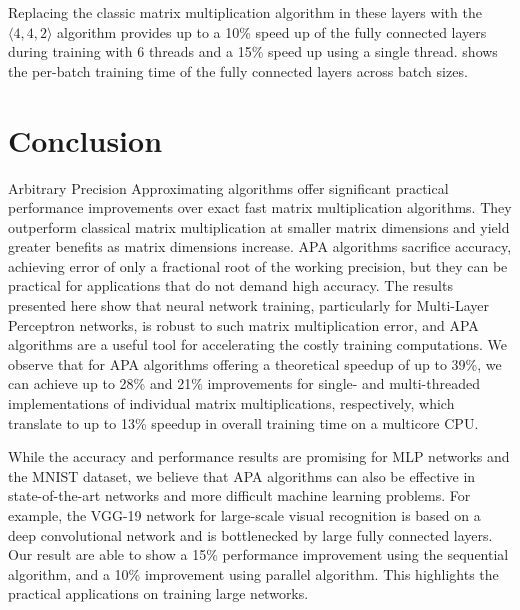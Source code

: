\documentclass[sigconf,review,anonymous]{acmart}
\newcommand{\dims}[1]{\langle #1 \rangle}
\begin{document}

Replacing the classic matrix multiplication algorithm in these layers with the $\dims{4,4,2}$ algorithm provides up to a 10\% speed up of the fully connected layers during training with 6 threads and a 15\% speed up using a single thread. 
 shows the per-batch training time of the fully connected layers across batch sizes.

\section{Conclusion}

Arbitrary Precision Approximating algorithms offer significant practical performance improvements over exact fast matrix multiplication algorithms.
They outperform classical matrix multiplication at smaller matrix dimensions and yield greater benefits as matrix dimensions increase.
APA algorithms sacrifice accuracy, achieving error of only a fractional root of the working precision, but they can be practical for applications that do not demand high accuracy.
The results presented here show that neural network training, particularly for Multi-Layer Perceptron networks, is robust to such matrix multiplication error, and APA algorithms are a useful tool for accelerating the costly training computations.
We observe that for APA algorithms offering a theoretical speedup of up to 39\%, we can achieve up to 28\% and 21\% improvements for single- and multi-threaded implementations of individual matrix multiplications, respectively, which translate to up to 13\% speedup in overall training time on a multicore CPU.

While the accuracy and performance results are promising for MLP networks and the MNIST dataset, we believe that APA algorithms can also be effective in state-of-the-art networks and more difficult machine learning problems.
For example, the VGG-19 network for large-scale visual recognition \cite{SZ15} is based on a deep convolutional network and is bottlenecked by large fully connected layers.
Our result are able to show a 15\% performance improvement using the sequential algorithm, and a 10\% improvement using parallel algorithm.
This highlights the practical applications on training large networks.
\end{document}
